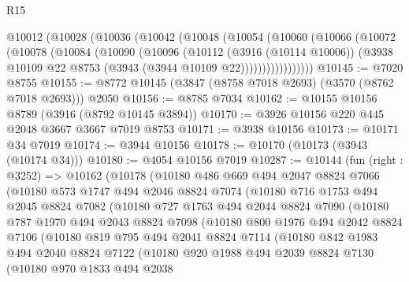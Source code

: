 \begin{lexlean}{R15}
\begin{coremodule}
    @10012
      (@10028
        (@10036
          (@10042
            (@10048
              (@10054
                (@10060
                  (@10066
                    (@10072
                      (@10078
                        (@10084
                          (@10090
                            (@10096
                              (@10112
                                (@3916 (@10114 @10006))
                                (@3938 @10109 @22 @8753 (@3943 (@3944 @10109 @22)))))))))))))))))
@10145 := @7020 @8755
@10155 := @8772 @10145 (@3847 (@8758 @7018 @2693) (@3570 (@8762 @7018 @2693))) @2050
@10156 := @8785 @7034
@10162 := @10155 @10156 @8789 (@3916 (@8792 @10145 @3894))
@10170 := @3926 @10156 @220 @445 @2048 @3667 @3667 @7019 @8753
@10171 := @3938 @10156
@10173 := @10171 @34 @7019
@10174 := @3944 @10156
@10178 := @10170 (@10173 (@3943 (@10174 @34)))
@10180 := @4054 @10156 @7019
@10287 := @10144
    (fun (right : @3252) =>
    @10162
      (@10178
        (@10180
          @486
          @669
          @494
          @2047
          @8824
          @7066
          (@10180
            @573
            @1747
            @494
            @2046
            @8824
            @7074
            (@10180
              @716
              @1753
              @494
              @2045
              @8824
              @7082
              (@10180
                @727
                @1763
                @494
                @2044
                @8824
                @7090
                (@10180
                  @787
                  @1970
                  @494
                  @2043
                  @8824
                  @7098
                  (@10180
                    @800
                    @1976
                    @494
                    @2042
                    @8824
                    @7106
                    (@10180
                      @819
                      @795
                      @494
                      @2041
                      @8824
                      @7114
                      (@10180
                        @842
                        @1983
                        @494
                        @2040
                        @8824
                        @7122
                        (@10180
                          @920
                          @1988
                          @494
                          @2039
                          @8824
                          @7130
                          (@10180
                            @970
                            @1833
                            @494
                            @2038

\end{coremodule}
\end{lexlean}
